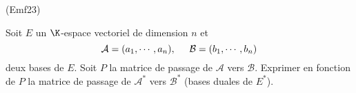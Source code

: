\begin{tiny}(Emf23)\end{tiny} Soit $E$ un $\K$-espace vectoriel de dimension $n$ et 
\begin{displaymath}
  \mathcal{A}=(a_1,\cdots,a_n),\hspace{0.5cm}\mathcal{B}=(b_1,\cdots,b_n)
\end{displaymath}
deux bases de $E$. Soit $P$ la matrice de passage de $\mathcal{A}$ vers $\mathcal{B}$. Exprimer en fonction de $P$ la matrice de passage de $\mathcal{A}^*$ vers $\mathcal{B}^*$ (bases duales de $E^*$).